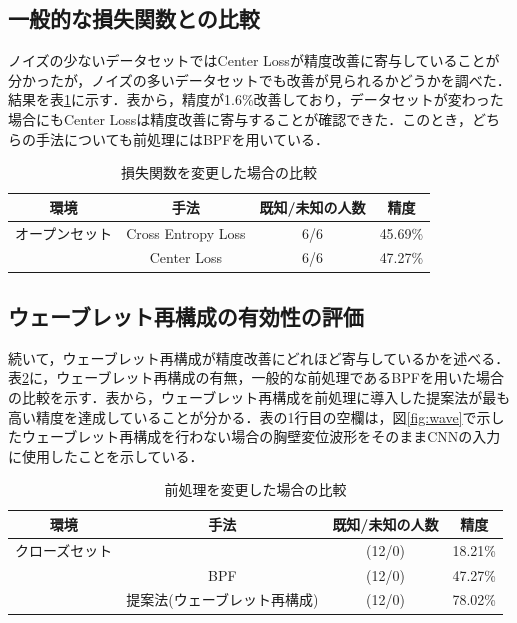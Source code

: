 \subsection{一般的な損失関数との比較}
ノイズの少ないデータセットではCenter Lossが精度改善に寄与していることが分かったが，ノイズの多いデータセットでも改善が見られるかどうかを調べた．結果を表\ref{table:comparison_loss_HCU}に示す．表から，精度が1.6\%改善しており，データセットが変わった場合にもCenter Lossは精度改善に寄与することが確認できた．このとき，どちらの手法についても前処理にはBPFを用いている．

\begin{table}[H]
  \caption{損失関数を変更した場合の比較}
  \centering
  \begin{tabular}{cccc}
  \hline
  環境 & 手法 & 既知/未知の人数 & 精度 \\
  \hline
  オープンセット & Cross Entropy Loss & 6/6 & 45.69\% \\
  & Center Loss & 6/6 & 47.27\% \\
  \hline
  \end{tabular}
  \label{table:comparison_loss_HCU}
\end{table}

\subsection{ウェーブレット再構成の有効性の評価}
続いて，ウェーブレット再構成が精度改善にどれほど寄与しているかを述べる．表\ref{table:comparison_wavelet}に，ウェーブレット再構成の有無，一般的な前処理であるBPFを用いた場合の比較を示す．表から，ウェーブレット再構成を前処理に導入した提案法が最も高い精度を達成していることが分かる．表の1行目の空欄は，図\ref{fig:wave}で示したウェーブレット再構成を行わない場合の胸壁変位波形をそのままCNNの入力に使用したことを示している．

\begin{table}[H]
  \caption{前処理を変更した場合の比較}
  \centering
  \begin{tabular}{cccc}
  \hline
  環境 & 手法 & 既知/未知の人数 & 精度 \\
  \hline
  クローズセット &  & (12/0) & 18.21\% \\
  & BPF & (12/0) & 47.27\% \\
  & 提案法(ウェーブレット再構成) & (12/0) & 78.02\% \\
  \hline
  \end{tabular}
  \label{table:comparison_wavelet}
\end{table}

